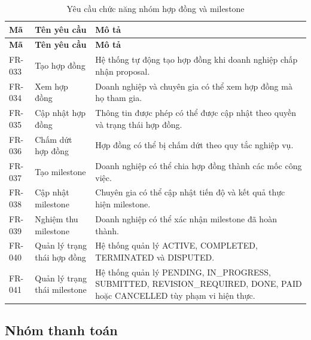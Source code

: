 \begin{longtable}{|p{2.0cm}|p{4.2cm}|p{7.6cm}|}
\caption{Yêu cầu chức năng nhóm hợp đồng và milestone}
\label{tab:fr-contract} \\ \hline
\textbf{Mã} & \textbf{Tên yêu cầu} & \textbf{Mô tả} \\ \hline
\endfirsthead
\hline
\textbf{Mã} & \textbf{Tên yêu cầu} & \textbf{Mô tả} \\ \hline
\endhead

FR-033 & Tạo hợp đồng & Hệ thống tự động tạo hợp đồng khi doanh nghiệp chấp nhận proposal. \\ \hline
FR-034 & Xem hợp đồng & Doanh nghiệp và chuyên gia có thể xem hợp đồng mà họ tham gia. \\ \hline
FR-035 & Cập nhật hợp đồng & Thông tin được phép có thể được cập nhật theo quyền và trạng thái hợp đồng. \\ \hline
FR-036 & Chấm dứt hợp đồng & Hợp đồng có thể bị chấm dứt theo quy tắc nghiệp vụ. \\ \hline
FR-037 & Tạo milestone & Doanh nghiệp có thể chia hợp đồng thành các mốc công việc. \\ \hline
FR-038 & Cập nhật milestone & Chuyên gia có thể cập nhật tiến độ và kết quả thực hiện milestone. \\ \hline
FR-039 & Nghiệm thu milestone & Doanh nghiệp có thể xác nhận milestone đã hoàn thành. \\ \hline
FR-040 & Quản lý trạng thái hợp đồng & Hệ thống quản lý ACTIVE, COMPLETED, TERMINATED và DISPUTED. \\ \hline
FR-041 & Quản lý trạng thái milestone & Hệ thống quản lý PENDING, IN\_PROGRESS, SUBMITTED, REVISION\_REQUIRED, DONE, PAID hoặc CANCELLED tùy phạm vi hiện thực. \\ \hline
\end{longtable}

\subsection{Nhóm thanh toán}

